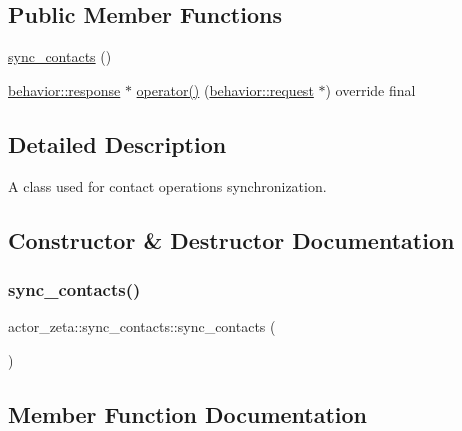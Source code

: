 \subsection*{Public Member Functions}
\begin{DoxyCompactItemize}
\item 
\hyperlink{classactor__zeta_1_1sync__contacts_abd18e91a793caa6938a1384251e5180c}{sync\+\_\+contacts} ()
\item 
\hyperlink{classactor__zeta_1_1behavior_1_1response}{behavior\+::response} $\ast$ \hyperlink{classactor__zeta_1_1sync__contacts_ab135afb3284f42dc36d54ea73a8b5ac8}{operator()} (\hyperlink{classactor__zeta_1_1behavior_1_1request}{behavior\+::request} $\ast$) override final
\end{DoxyCompactItemize}


\subsection{Detailed Description}
A class used for contact operations synchronization. 

\subsection{Constructor \& Destructor Documentation}
\mbox{\label{classactor__zeta_1_1sync__contacts_abd18e91a793caa6938a1384251e5180c}} 
\subsubsection{\texorpdfstring{sync\+\_\+contacts()}{sync\_contacts()}}
{\footnotesize\ttfamily actor\+\_\+zeta\+::sync\+\_\+contacts\+::sync\+\_\+contacts (\begin{DoxyParamCaption}{ }\end{DoxyParamCaption})}



\subsection{Member Function Documentation}
\mbox{\label{classactor__zeta_1_1sync__contacts_ab135afb3284f42dc36d54ea73a8b5ac8}} 
